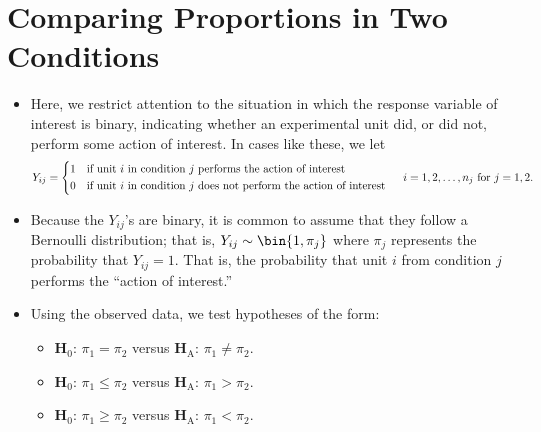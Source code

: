 \section{Comparing Proportions in Two Conditions}
\begin{itemize}
    \item Here, we restrict attention to the situation in which the response variable of interest
          is binary, indicating whether an experimental unit did, or did not, perform
          some action of interest. In cases like these, we let
          \[ Y_{ij}=\begin{cases*}
                  1 & if unit $ i $ in condition $ j $ performs the action of interest         \\
                  0 & if unit $ i $ in condition $ j $ does not perform the action of interest
              \end{cases*}\quad i=1,2,\ldots,n_j\text{ for } j=1,2. \]
    \item Because the $ Y_{ij} $'s are binary, it is common to assume that they follow
          a Bernoulli distribution; that is, $ Y_{ij}\sim \bin{1,\pi_j} $ where
          $ \pi_j $ represents the probability that $ Y_{ij}=1 $. That is,
          the probability that unit $ i $ from condition $ j $ performs the ``action of interest.''
    \item Using the observed data, we test hypotheses of the form:
          \begin{itemize}
              \item $ \mathbf{H}_0 $: $ \pi_1=\pi_2 $ versus $ \mathbf{H}_\text{A} $: $ \pi_1\ne\pi_2 $.
              \item $ \mathbf{H}_0 $: $ \pi_1\le\pi_2 $ versus $ \mathbf{H}_\text{A} $: $ \pi_1>\pi_2 $.
              \item $ \mathbf{H}_0 $: $ \pi_1\ge\pi_2 $ versus $ \mathbf{H}_\text{A} $: $ \pi_1<\pi_2 $.
          \end{itemize}
\end{itemize}

